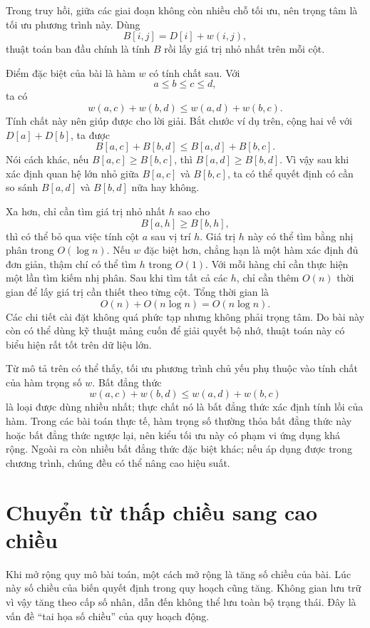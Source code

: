 \documentclass[11pt]{article}
\begin{document}
Trong truy hồi, giữa các giai đoạn không còn nhiều chỗ tối ưu, nên trọng tâm
là tối ưu phương trình này. Dùng
\[
  B[i,j]=D[i]+w(i,j),
\]
thuật toán ban đầu chính là tính \(B\) rồi lấy giá trị nhỏ nhất trên mỗi cột.

Điểm đặc biệt của bài là hàm \(w\) có tính chất sau. Với
\[
  a\le b\le c\le d,
\]
ta có
\[
  w(a,c)+w(b,d)\le w(a,d)+w(b,c).
\]
Tính chất này nên giúp được cho lời giải. Bắt chước ví dụ trên, cộng hai vế
với \(D[a]+D[b]\), ta được
\[
  B[a,c]+B[b,d]\le B[a,d]+B[b,c].
\]
Nói cách khác, nếu \(B[a,c]\ge B[b,c]\), thì \(B[a,d]\ge B[b,d]\). Vì vậy sau
khi xác định quan hệ lớn nhỏ giữa \(B[a,c]\) và \(B[b,c]\), ta có thể quyết
định có cần so sánh \(B[a,d]\) và \(B[b,d]\) nữa hay không.

Xa hơn, chỉ cần tìm giá trị nhỏ nhất \(h\) sao cho
\[
  B[a,h]\ge B[b,h],
\]
thì có thể bỏ qua việc tính cột \(a\) sau vị trí \(h\). Giá trị \(h\) này có
thể tìm bằng nhị phân trong \(O(\log n)\). Nếu \(w\) đặc biệt hơn, chẳng hạn
là một hàm xác định đủ đơn giản, thậm chí có thể tìm \(h\) trong \(O(1)\).
Với mỗi hàng chỉ cần thực hiện một lần tìm kiếm nhị phân. Sau khi tìm tất cả
các \(h\), chỉ cần thêm \(O(n)\) thời gian để lấy giá trị cần thiết theo từng
cột. Tổng thời gian là
\[
  O(n)+O(n\log n)=O(n\log n).
\]
Các chi tiết cài đặt không quá phức tạp nhưng không phải trọng tâm. Do bài
này còn có thể dùng kỹ thuật mảng cuốn để giải quyết bộ nhớ, thuật toán này
có biểu hiện rất tốt trên dữ liệu lớn.

Từ mô tả trên có thể thấy, tối ưu phương trình chủ yếu phụ thuộc vào tính chất
của hàm trọng số \(w\). Bất đẳng thức
\[
  w(a,c)+w(b,d)\le w(a,d)+w(b,c)
\]
là loại được dùng nhiều nhất; thực chất nó là bất đẳng thức xác định tính lồi
của hàm. Trong các bài toán thực tế, hàm trọng số thường thỏa bất đẳng thức
này hoặc bất đẳng thức ngược lại, nên kiểu tối ưu này có phạm vi ứng dụng khá
rộng. Ngoài ra còn nhiều bất đẳng thức đặc biệt khác; nếu áp dụng được trong
chương trình, chúng đều có thể nâng cao hiệu suất.

\section{Chuyển từ thấp chiều sang cao chiều}

Khi mở rộng quy mô bài toán, một cách mở rộng là tăng số chiều của bài. Lúc
này số chiều của biến quyết định trong quy hoạch cũng tăng. Không gian lưu trữ
vì vậy tăng theo cấp số nhân, dẫn đến không thể lưu toàn bộ trạng thái. Đây là
vấn đề ``tai họa số chiều'' của quy hoạch động.
\end{document}
